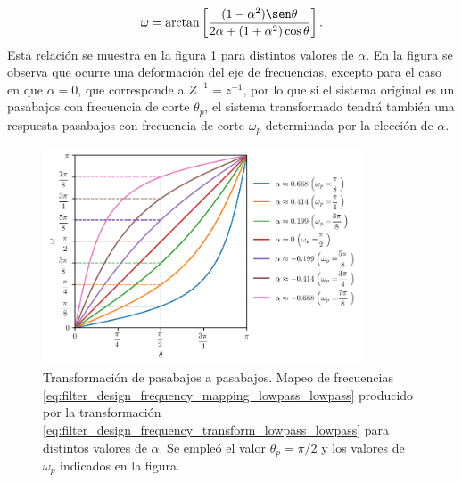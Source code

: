 \documentclass[a4paper]{report}
\begin{document}
\begin{equation}\label{eq:filter_design_frequency_mapping_lowpass_lowpass}
 \omega=\arctan\left[\frac{(1-\alpha^2)\sen\theta}{2\alpha+(1+\alpha^2)\cos\theta}\right].
\end{equation}
Esta relación se muestra en la figura \ref{fig:filter_design_frequency_transformations_low_low_mapping} para distintos valores de \(\alpha\). En la figura se observa que ocurre una deformación del eje de frecuencias, excepto para el caso en que \(\alpha=0\), que corresponde a \(Z^{-1}=z^{-1}\), por lo que si el sistema original es un pasabajos con frecuencia de corte \(\theta_p\), el sistema transformado tendrá también una respuesta pasabajos con frecuencia de corte \(\omega_p\) determinada por la elección de \(\alpha\). 
\begin{figure}[!htb]
 \begin{center}
 \includegraphics[width=0.85\textwidth]{figuras/filter_design_frequency_transformations_low_low_mapping.pdf}
 \caption{\label{fig:filter_design_frequency_transformations_low_low_mapping} Transformación de pasabajos a pasabajos. Mapeo de frecuencias \ref{eq:filter_design_frequency_mapping_lowpass_lowpass} producido por la transformación \ref{eq:filter_design_frequency_transform_lowpass_lowpass} para distintos valores de \(\alpha\). Se  empleó el valor \(\theta_p=\pi/2\) y los valores de \(\omega_p\) indicados en la figura.}
 \end{center}
\end{figure}
\end{document}
